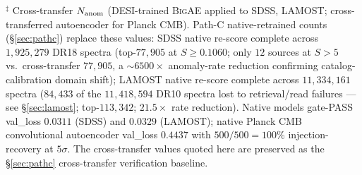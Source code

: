 \documentclass[aps,prd,twocolumn,superscriptaddress,showpacs,preprintnumbers,nofootinbib,longbibliography,floatfix]{revtex4-2}
\newcommand{\BigAE}{\textsc{BigAE}}
\begin{document}
{$^\ddagger$ Cross-transfer $N_{\rm anom}$ (DESI-trained \BigAE{} applied to SDSS, LAMOST; cross-transferred autoencoder for Planck CMB). Path-C native-retrained counts (\S\ref{sec:pathc}) replace these values: SDSS native re-score complete across $1{,}925{,}279$ DR18 spectra (top-$77{,}905$ at $S \geq 0.1060$; only $12$ sources at $S > 5$ vs.\ cross-transfer $77{,}905$, a $\sim 6500\times$ anomaly-rate reduction confirming catalog-calibration domain shift); LAMOST native re-score complete across $11{,}334{,}161$ spectra ($84{,}433$ of the $11{,}418{,}594$ DR10 spectra lost to retrieval/read failures --- see \S\ref{sec:lamost}; top-$113{,}342$; $21.5\times$ rate reduction). Native models gate-PASS val\_loss $0.0311$ (SDSS) and $0.0329$ (LAMOST); native Planck CMB convolutional autoencoder val\_loss $0.4437$ with $500/500=100\%$ injection-recovery at $5\sigma$. The cross-transfer values quoted here are preserved as the \S\ref{sec:pathc} cross-transfer verification baseline.\\
}
\end{document}
